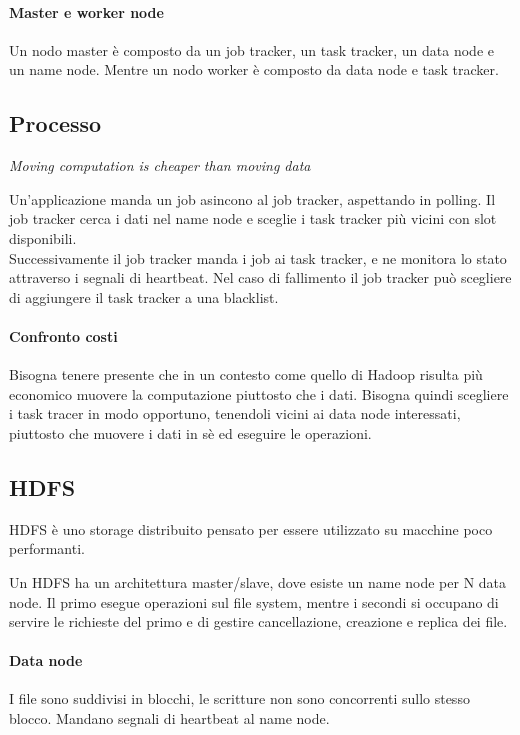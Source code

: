 \documentclass[a4paper]{article}
\begin{document}
\paragraph{Master e worker node}
Un nodo master è composto da un job tracker, un task tracker, un data node e un name node. Mentre un nodo worker è composto da data node e task tracker.

\subsection{Processo}
\begin{center}
        \emph{Moving computation is cheaper than moving data}
\end{center}
Un'applicazione manda un job asincono al job tracker, aspettando in polling.
Il job tracker cerca i dati nel name node e sceglie i task tracker più vicini
con slot disponibili.\\
Successivamente il job tracker manda i job ai task tracker, e ne monitora 
lo stato attraverso i segnali di heartbeat. Nel caso di fallimento il job tracker
può scegliere di aggiungere il task tracker a una blacklist.

\paragraph{Confronto costi}
Bisogna tenere presente che in un contesto come quello di Hadoop risulta 
più economico muovere la computazione piuttosto che i dati.
Bisogna quindi scegliere i task tracer in modo opportuno, tenendoli vicini ai 
data node interessati, piuttosto che muovere i dati in sè ed eseguire le operazioni.

\subsection{HDFS}
HDFS è uno storage distribuito pensato per essere utilizzato su macchine poco
performanti.

Un HDFS ha un architettura master/slave, dove esiste un name node per N data node.
Il primo esegue operazioni sul file system, mentre i secondi si occupano di 
servire le richieste del primo e di gestire cancellazione, creazione e replica dei 
file.

\paragraph{Data node}
I file sono suddivisi in blocchi, le scritture non sono concorrenti sullo stesso 
blocco. Mandano segnali di heartbeat al name node.
\end{document}
